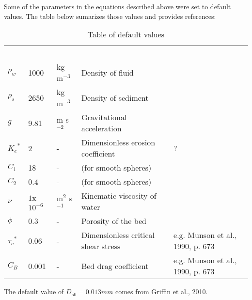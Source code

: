 \documentclass[11pt]{article}
\begin{document}
Some of the parameters in the equations described above were set to default values. The table below sumarizes those values and provides references:

\begin{table}[]
\centering
\caption{Table of default values}
\begin{tabular}{|l|l|l|l|l|}
\ \\ \cline{1-5}
$\rho_w$ & 1000 & kg m$^{-3}$ & Density of fluid           &  \\ \cline{1-5}
$\rho_s$ & 2650 & kg m$^{-3}$ & Density of sediment        &  \\ \cline{1-5}
$g$      & 9.81 & m s$^{-2}$  & Gravitational acceleration &  \\ \cline{1-5}
${K_e}^*$         &   2   & - & Dimensionless erosion coefficient &  ?\\ \cline{1-5}
$C_1$         &  18    &       -      & (for smooth spheres)                           & \citep{ferguson2004simple} \\ \cline{1-5}
$C_2$         &    0.4  &       -      & (for smooth spheres)                            & \citep{ferguson2004simple} \\ \cline{1-5}
$\nu$         &  $1$x${10}^{-6}$    &   m$^2$ s$^{-1}$          &   Kinematic viscosity of water                         &  \\ \cline{1-5}
$\phi$         &   0.3   &     -        & Porosity of the bed  & &\\ \cline{1-5}
${\tau_c}^*$         &   0.06   &     -        & Dimensionless critical shear stress     & e.g. Munson et al., 1990, p. 673 &\\ \cline{1-5}
$C_B$         &   0.001   &     -        & Bed drag coefficient                           & e.g. Munson et al., 1990, p. 673 &\\ \cline{1-5}
\end{tabular}
\end{table}

The default value of $D_{50} = 0.013 mm$ comes from Griffin et al., 2010.
\end{document}
